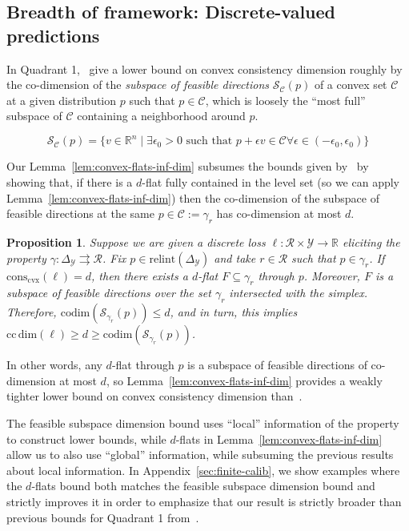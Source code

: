 \documentclass[11pt]{article} %
\newcommand{\reals}{\mathbb{R}}
\newcommand{\simplex}{\Delta_\Y}
\newcommand{\relint}[1]{\mathrm{relint}(#1)}
\newcommand{\conscvx}{\mathrm{cons}_\mathrm{cvx}}
\newcommand{\ccdim}{\mathrm{cc\,dim}}
\newcommand{\codim}{\mathrm{codim}}
\newcommand{\C}{\mathcal{C}}
\newcommand{\R}{\mathcal{R}}
\newcommand{\Sc}{\mathcal{S}}  %
\newcommand{\Y}{\mathcal{Y}}
\newcommand{\toto}{\rightrightarrows}
\newtheorem{proposition}{Proposition}
\begin{document}
\subsection{Breadth of framework: Discrete-valued predictions}\label{sec:discrete-predictions-refactored}

In Quadrant 1,~\citet{ramaswamy2016convex} give a lower bound on convex consistency dimension roughly by the co-dimension of the \emph{subspace of feasible directions} $\Sc_{\C}(p)$ of a convex set $\C$ at a given distribution $p$ such that $p \in \C$, which is loosely the ``most full'' subspace of $\C$ containing a neighborhood around $p$.

\begin{equation*}\label{eq:feasible-subspace}
\Sc_\C(p) = \{v \in \reals^n \mid \exists \epsilon_0 > 0 \textrm{ such that } p + \epsilon v \in \C\forall \epsilon \in (-\epsilon_0, \epsilon_0) \}
\end{equation*}

Our Lemma~\ref{lem:convex-flats-inf-dim} subsumes the  bounds given by~\citet{ramaswamy2016convex} by showing that, if there is a $d$-flat fully contained in the level set (so we can apply Lemma~\ref{lem:convex-flats-inf-dim}) then the co-dimension of the subspace of feasible directions at the same $p \in \C := \gamma_r$ has co-dimension at most $d$.

\begin{proposition}\label{prop:discrete-bound-subsumes-ramaswamy}
	Suppose we are given a discrete loss $\ell : \R \times \Y \to \reals$ eliciting the property $\gamma: \simplex \toto \R$.
	Fix $p \in \relint \simplex$ and take $r \in \R$ such that $p \in \gamma_r$.  
	If $\conscvx(\ell) = d$, then there exists a $d$-flat $F \subseteq \gamma_r$ through $p$.
	Moreover, $F$ is a subspace of feasible directions over the set $\gamma_r$ intersected with the simplex.
	Therefore, $\codim(\Sc_{\gamma_r}(p)) \leq d$, and in turn, this implies $\ccdim(\ell) \geq d \geq \codim(\Sc_{\gamma_r}(p))$.
\end{proposition}

In other words, any $d$-flat through $p$ is a subspace of feasible directions of co-dimension at most $d$, so Lemma~\ref{lem:convex-flats-inf-dim} provides a weakly tighter lower bound on convex consistency dimension than~\citet[Theorem 16]{ramaswamy2016convex}.

The feasible subspace dimension bound uses ``local'' information of the property to construct lower bounds, while $d$-flats in Lemma~\ref{lem:convex-flats-inf-dim} allow us to also use ``global'' information, while subsuming the previous results about local information.
In Appendix~\ref{sec:finite-calib}, we show examples where the $d$-flats bound both matches the feasible subspace dimension bound and strictly improves it in order to emphasize that our result is strictly broader than previous bounds for Quadrant 1 from~\citet{ramaswamy2016convex}.
\end{document}
